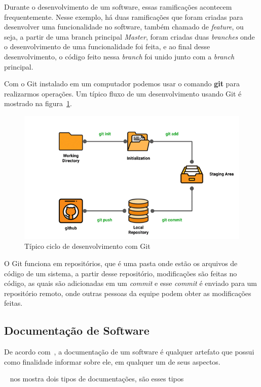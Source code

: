\documentclass[12pt]{article}
\begin{document}
Durante o desenvolvimento de um software, essas ramificações acontecem frequentemente. Nesse exemplo,
há duas ramificações que foram criadas para desenvolver uma funcionalidade no software, também chamado de \textit{feature},
ou seja, a partir de uma branch principal \textit{Master}, foram criadas duas \textit{branches} onde o desenvolvimento
de uma funcionalidade foi feita, e ao final desse desenvolvimento, o código feito nessa \textit{branch} foi
unido junto com a \textit{branch} principal.

Com o Git instalado em um computador podemos usar o comando \textbf{git} para realizarmos operações.
Um típico fluxo de um desenvolvimento usando Git é mostrado na figura~\ref{fig:git-lifecycle}.

\begin{figure}[H]
  \centering
  \includegraphics[width=.8\textwidth]{git/git-lifecycle.png}
  \caption{Típico ciclo de desenvolvimento com Git}\label{fig:git-lifecycle}
\end{figure}

O Git funciona em repositórios, que é uma pasta onde estão os arquivos de código de um sistema,
a partir desse repositório, modificações são feitas no código, as quais são adicionadas em um \textit{commit}
e esse \textit{commit} é enviado para um repositório remoto, onde outras pessoas da equipe podem obter as modificações feitas.

\subsection{Documentação de Software}

De acordo com~\cite{Forward02softwaredocumentation}, a documentação de um software é qualquer
artefato que possui como finalidade informar sobre ele, em qualquer um de seus aspectos.

~\cite{Coelho_2009} nos mostra dois tipos de documentações, são esses tipos
\end{document}
